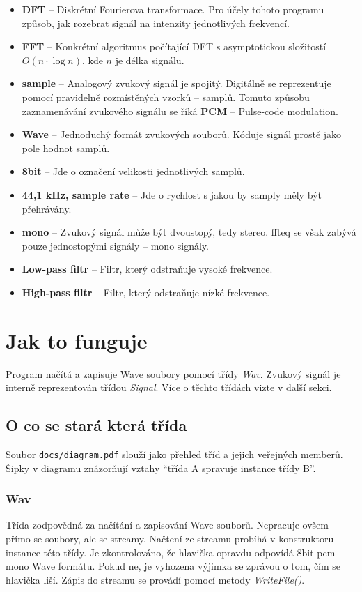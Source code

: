 \documentclass{article}
\begin{document}
\begin{itemize}
	\item	\textbf{DFT} -- Diskrétní Fourierova transformace. Pro účely
		tohoto programu způsob, jak rozebrat signál na intenzity
		jednotlivých frekvencí.
	\item	\textbf{FFT} -- Konkrétní algoritmus počítající DFT s
		asymptotickou složitostí $O(n \cdot \log{n})$, kde $n$ je délka
		signálu.
	\item	\textbf{sample} -- Analogový zvukový signál je spojitý.
		Digitálně se reprezentuje pomocí pravidelně rozmístěných vzorků
		-- samplů.  Tomuto způsobu zaznamenávání zvukového signálu se
		říká \textbf{PCM} -- Pulse-code modulation.
	\item	\textbf{Wave} -- Jednoduchý formát zvukových souborů. Kóduje
		signál prostě jako pole hodnot samplů.
	\item	\textbf{8bit} -- Jde o označení velikosti jednotlivých samplů.
	\item	\textbf{44,1 kHz, sample rate} -- Jde o rychlost s jakou by
		samply měly být přehrávány.
	\item	\textbf{mono} -- Zvukový signál může být dvoustopý, tedy
		stereo. ffteq se však zabývá pouze jednostopými signály -- mono
		signály.
	\item	\textbf{Low-pass filtr} -- Filtr, který odstraňuje vysoké
		frekvence.
	\item	\textbf{High-pass filtr} -- Filtr, který odstraňuje nízké
		frekvence.
\end{itemize}


\section*{Jak to funguje}

Program načítá a zapisuje Wave soubory pomocí třídy \emph{Wav}. Zvukový signál
je interně reprezentován třídou \emph{Signal}. Více o těchto třídách vizte v
další sekci.

\subsection*{O co se stará která třída}

Soubor \texttt{docs/diagram.pdf} slouží jako přehled tříd a jejich veřejných
memberů. Šipky v diagramu znázorňují vztahy \enquote{třída A spravuje instance
třídy B}.

\subsubsection*{Wav}
Třída zodpovědná za načítání a zapisování Wave souborů. Nepracuje ovšem přímo
se soubory, ale se streamy. Načtení ze streamu probíhá v konstruktoru instance
této třídy. Je zkontrolováno, že hlavička opravdu odpovídá 8bit pcm mono Wave
formátu. Pokud ne, je vyhozena výjimka se zprávou o tom, čím se hlavička liší.
Zápis do streamu se provádí pomocí metody \emph{WriteFile()}.
\end{document}
